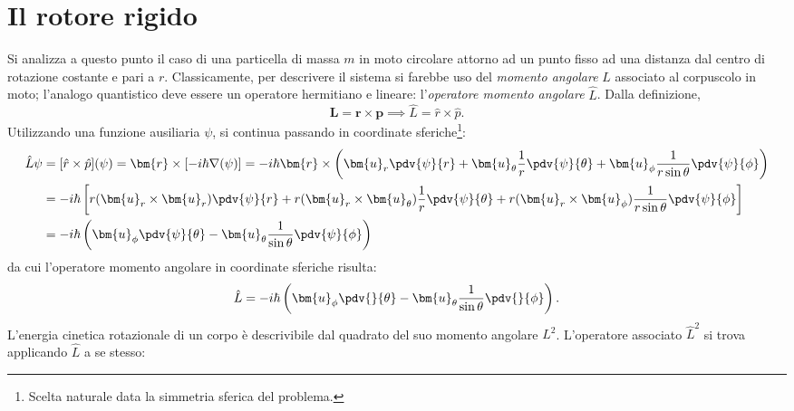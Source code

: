 \documentclass[a4paper,11pt]{report}
\begin{document}
\section{Il rotore rigido}
Si analizza a questo punto il caso di una particella di massa $m$ in moto circolare attorno ad un punto fisso ad una distanza dal centro di rotazione costante e pari a $r$. Classicamente, per descrivere il sistema si farebbe uso del \textit{momento angolare} $L$ associato al corpuscolo in moto; l'analogo quantistico deve essere un operatore hermitiano e lineare: l'\textit{operatore momento angolare} $\hat{L}$. Dalla definizione, 
\begin{equation}
  \bm{L} = \bm{r} \times \bm{p} \implies \hat{L} = \hat{r} \times \hat{p}.
\end{equation}
Utilizzando una funzione ausiliaria $\psi$, si continua passando in coordinate sferiche\footnote{Scelta naturale data la simmetria sferica del problema.}:
\begin{equation}
\begin{aligned}
  \hat{L}\psi &= [\hat{r} \times \hat{p}](\psi) = \bm{r} \times[ -i\hbar \nabla (\psi)] = -i\hbar \bm{r} \times \left( \bm{u}_r \pdv{\psi}{r} + \bm{u}_{\theta} \frac{1}{r} \pdv{\psi}{\theta} + \bm{u}_{\phi} \frac{1}{r\sin\theta} \pdv{\psi}{\phi} \right) \\
  &= -i\hbar  \left[r(\bm{u}_r \times \bm{u}_r) \pdv{\psi}{r} + r(\bm{u}_r \times \bm{u}_{\theta}) \frac{1}{r} \pdv{\psi}{\theta} + r(\bm{u}_r \times \bm{u}_{\phi}) \frac{1}{r\sin\theta} \pdv{\psi}{\phi} \right]  \\
  &= -i\hbar  \left(  \bm{u}_{\phi} \pdv{\psi}{\theta} -  \bm{u}_{\theta} \frac{1}{\sin\theta} \pdv{\psi}{\phi} \right)
  \end{aligned}
\end{equation}
da cui l'operatore momento angolare in coordinate sferiche risulta:
\begin{equation}
  \hat{L} = -i\hbar  \left(  \bm{u}_{\phi} \pdv{}{\theta} -  \bm{u}_{\theta} \frac{1}{\sin\theta} \pdv{}{\phi} \right).
\end{equation}
L'energia cinetica rotazionale di un corpo è descrivibile dal quadrato del suo momento angolare $L^2$. L'operatore associato $\hat{L}^2$ si trova applicando $\hat{L}$ a se stesso:
\end{document}
